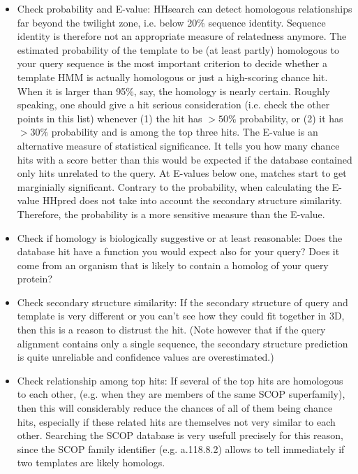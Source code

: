\documentclass[11pt,a4paper]{article}
\begin{document}
\begin{itemize}

\item{Check probability and E-value: HHsearch can detect homologous relationships far beyond the twilight zone, i.e. below 20\% sequence identity. Sequence identity is therefore not an appropriate measure of relatedness anymore. The estimated probability of the template to be (at least partly) homologous to your query sequence is the most important criterion to decide whether a template HMM is actually homologous or just a high-scoring chance hit. When it is larger than 95\%, say, the homology is nearly certain. Roughly speaking, one should give a hit serious consideration (i.e. check the other points in this list) whenever (1) the hit has $>50\%$ probability, or (2) it has $>30\%$ probability and is among the top three hits. The E-value is an alternative measure of statistical significance. It tells you how many chance hits with a score better than this would be expected if the database contained only hits unrelated to the query. At E-values below one, matches start to get marginially significant. Contrary to the probability, when calculating the E-value HHpred does not take into account the secondary structure similarity. Therefore, the probability is a more sensitive measure than the E-value.}

\item{Check if homology is biologically suggestive or at least reasonable: Does the database hit have a function you would expect also for your query? Does it come from an organism that is likely to contain a homolog of your query protein?}

\item{Check secondary structure similarity: If the secondary structure of query and template is very different or you can't see how they could fit together in 3D, then this is a reason to distrust the hit. (Note however that if the query alignment contains only a single sequence, the secondary structure prediction is quite unreliable and confidence values are overestimated.)}

\item{Check relationship among top hits: If several of the top hits are homologous to each other, (e.g. when they are members of the same SCOP superfamily), then this will considerably reduce the chances of all of them being chance hits, especially if these related hits are themselves not very similar to each other. Searching the SCOP database is very usefull precisely for this reason, since the SCOP family identifier (e.g. a.118.8.2) allows to tell immediately if two templates are likely homologs.}


\end{itemize}
\end{document}
